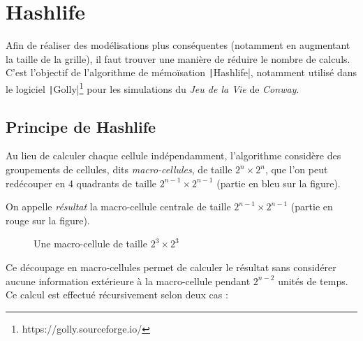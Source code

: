 \documentclass[12pt]{article}
\begin{document}
\section{Hashlife}

Afin de réaliser des modélisations plus conséquentes (notamment en augmentant la taille de la grille), il faut trouver une manière de réduire le nombre de calculs. C'est l'objectif de l'algorithme de mémoïsation \texttt|Hashlife|, notamment utilisé dans le logiciel \texttt|Golly|\footnote{https://golly.sourceforge.io/} pour les simulations du \textit{Jeu de la Vie} de \textit{Conway}.

\subsection{Principe de Hashlife}

Au lieu de calculer chaque cellule indépendamment, l'algorithme considère des groupements de cellules, dits \textit{macro-cellules}, de taille $2^n \times 2^n$, que l'on peut redécouper en 4 quadrants de taille $2^{n-1} \times 2^{n-1}$ (partie en bleu sur la figure).

On appelle \textit{résultat} la macro-cellule centrale de taille $2^{n-1} \times 2^{n-1}$ (partie en rouge sur la figure).

\begin{figure}[!ht]
    \centering
    \caption{Une macro-cellule de taille $2^{3} \times 2^{3}$}
\end{figure}

Ce découpage en macro-cellules permet de calculer le résultat sans considérer aucune information extérieure à la macro-cellule pendant $2^{n-2}$ unités de temps. Ce calcul est effectué récursivement selon deux cas :
\end{document}
